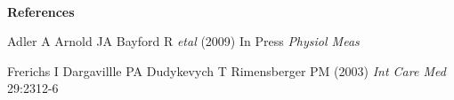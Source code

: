 \documentclass[12pt]{article}
\newcommand{\mysection}[1]{
~\\ \noindent
{\bf \normalsize #1}
\vspace{1mm}
}
\begin{document}
\mysection{References}
\begin{thebibliography}{9}
\setlength{\itemsep}{-2mm}
\vspace{-1.8cm}
Adler A  Arnold JA Bayford R {\em etal} (2009)
In Press {\em Physiol Meas}

Frerichs I Dargavillle PA Dudykevych T Rimensberger PM (2003) 
{\em Int Care Med} 29:2312-6

\end{thebibliography}
\end{document}
